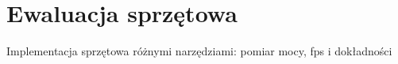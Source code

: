 \chapter{Ewaluacja sprzętowa}
\label{cha:Ewaluacja sprzętowa}

Implementacja sprzętowa różnymi narzędziami: pomiar mocy, fps i dokładności
